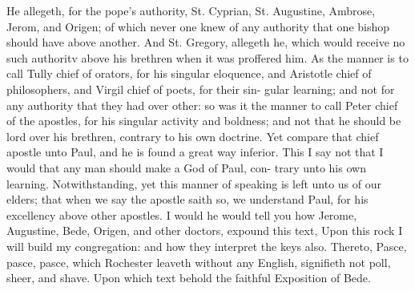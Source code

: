 \documentclass{custom}
\begin{document}
He allegeth, for the pope's authority, St. Cyprian, 
St. Augustine, Ambrose, Jerom, and Origen; of which 
never one knew of any authority that one bishop should 
have above another. And St. Gregory, allegeth he, which 
would receive no such authoritv above his brethren when it 
was proffered him. As the manner is to call Tully chief 
of orators, for his singular eloquence, and Aristotle chief 
of philosophers, and Virgil chief of poets, for their sin- 
gular learning; and not for any authority that they had 
over other: so was it the manner to call Peter chief of the 
apostles, for his singular activity and boldness; and not 
that he should be lord over his brethren, contrary to his 
own doctrine. Yet compare that chief apostle unto Paul, 
and he is found a great way inferior. This I say not that 
I would that any man should make a God of Paul, con- 
trary unto his own learning. Notwithstanding, yet this 
manner of speaking is left unto us of our elders; that 
when we say the apostle saith so, we understand Paul, for 
his excellency above other apostles. I would he would 
tell you how Jerome, Augustine, Bede, Origen, and other 
doctors, expound this text, Upon this rock I will build my 
congregation: and how they interpret the keys also. 
Thereto, Pasce, pasce, pasce, which Rochester leaveth 
without any English, signifieth not poll, sheer, and shave. 
Upon which text behold the faithful Exposition of Bede. 
\end{document}
